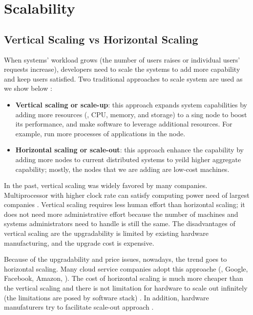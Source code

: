 \section{Scalability}
\label{bg-sc}

\subsection{Vertical Scaling vs Horizontal Scaling} 
\label{bg-sc-type}

When systems' workload grows (the number of users raises or individual users'
requests increase), developers need to scale the systems to add more capability
and keep users satisfied. Two traditional approaches to scale system are used as
we show below \cite{Michael+07-ScaleUpXScaleOut}:
\begin{itemize}

\item \textbf{Vertical scaling or scale-up}: this approach expands system
capabilities by adding more resources (\eg, CPU, memory, and storage) to a
sing node to boost its performance, and make software to leverage additional
resources. For example, run more processes of applications in the node.

\item \textbf{Horizontal scaling or scale-out}: this approach enhance the
capability by adding more nodes to current distributed systems to yeild higher
aggregate capability; mostly, the nodes that we are adding are low-cost
machines.

\end{itemize}

In the past, vertical scaling was widely favored by many companies.
Multiprocessor with higher clock rate can satisfy computing power need of
largest companies \cite{Michael+07-ScaleUpXScaleOut}. Vertical scaling requires
less human effort than horizontal scaling; it does not need more administrative
effort because the number of machines and systems administrators need to handle
is still the same. The disadvantages of vertical scaling are the upgradability
is limited by existing hardware manufacturing, and the upgrade cost is
expensive.

Because of the upgradability and price issues, nowadays, the trend goes to
horizontal scaling. Many cloud service companies adopt this approache (\eg,
Google, Facebook, Amazon, \etc). The cost of horizontal scaling is much more
cheaper than the vertical scaling and there is not limitation for hardware to
scale out infinitely (the limitations are posed by software stack)
\cite{ScaleUpVsScaleOut}. In addition, hardware manufaturers try to facilitate
scale-out approach \cite{Michael+07-ScaleUpXScaleOut}.

